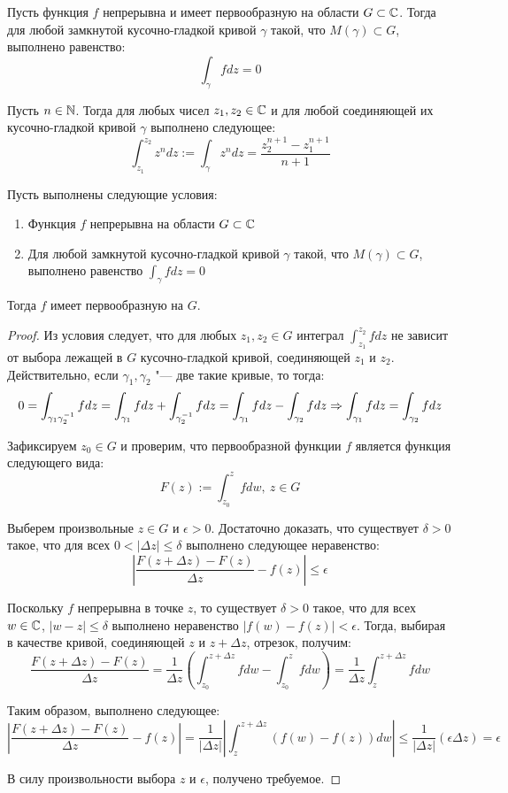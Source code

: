 \begin{corollary}
	Пусть функция $f$ непрерывна и имеет первообразную на области $G \subset \mathbb{C}$. Тогда для любой замкнутой кусочно-гладкой кривой $\gamma$ такой, что $M(\gamma) \subset G$, выполнено равенство:
	\[\int_\gamma fdz = 0\]
\end{corollary}

\begin{example}
	Пусть $n \in \mathbb{N}$. Тогда для любых чисел $z_1, z_2 \in \mathbb{C}$ и для любой соединяющей их кусочно-гладкой кривой $\gamma$ выполнено следующее:
	\[\int_{z_1}^{z_2}z^ndz := \int_\gamma z^ndz = \frac{z_2^{n+1} - z_1^{n+1}}{n+1}\]
\end{example}

\begin{proposition}
	Пусть выполнены следующие условия:
	\begin{enumerate}
		\item Функция $f$ непрерывна на области $G \subset \mathbb{C}$
		\item Для любой замкнутой кусочно-гладкой кривой $\gamma$ такой, что $M(\gamma) \subset G$, выполнено равенство $\int_\gamma fdz = 0$
	\end{enumerate}

	Тогда $f$ имеет первообразную на $G$.
\end{proposition}

\begin{proof}
	Из условия следует, что для любых $z_1, z_2 \in G$ интеграл $\int_{z_1}^{z_2} fdz$ не зависит от выбора лежащей в $G$ кусочно-гладкой кривой, соединяющей $z_1$ и $z_2$. Действительно, если $\gamma_1, \gamma_2$ "--- две такие кривые, то тогда:
	\[0 = \int_{\gamma_1\gamma_2^{-1}}fdz = \int_{\gamma_1}fdz + \int_{\gamma_2^{-1}}fdz = \int_{\gamma_1}fdz - \int_{\gamma_2}fdz \Rightarrow \int_{\gamma_1}fdz = \int_{\gamma_2}fdz\]
	
	Зафиксируем $z_0 \in G$ и проверим, что первообразной функции $f$ является функция следующего вида:
	\[F(z) := \int_{z_0}^zfdw,~z \in G\]
	
	Выберем произвольные $z \in G$ и $\epsilon > 0$. Достаточно доказать, что существует $\delta > 0$ такое, что для всех $0 < |\Delta z| \le \delta$ выполнено следующее неравенство:
	\[\left|\frac{F(z + \Delta z) - F(z)}{\Delta z} - f(z)\right| \le \epsilon\]
	
	Поскольку $f$ непрерывна в точке $z$, то существует $\delta > 0$ такое, что для всех $w \in \mathbb{C}$, $|w - z| \le \delta$ выполнено неравенство $|f(w) - f(z)| < \epsilon$. Тогда, выбирая в качестве кривой, соединяющей $z$ и $z + \Delta z$, отрезок, получим:
	\[\frac{F(z + \Delta z) - F(z)}{\Delta z} = \frac{1}{\Delta z}\left(\int_{z_0}^{z + \Delta z}fdw - \int_{z_0}^{z}fdw\right) = \frac{1}{\Delta z}\int_{z}^{z + \Delta z}fdw\]
	
	Таким образом, выполнено следующее:
	\[\left|\frac{F(z + \Delta z) - F(z)}{\Delta z} - f(z)\right| = \frac1{|\Delta z|}\left|\int_z^{z + \Delta z}\left(f(w) - f(z)\right)dw\right| \le \frac1{|\Delta z|}(\epsilon\Delta z) = \epsilon\]
	
	В силу произвольности выбора $z$ и $\epsilon$, получено требуемое.
\end{proof}

